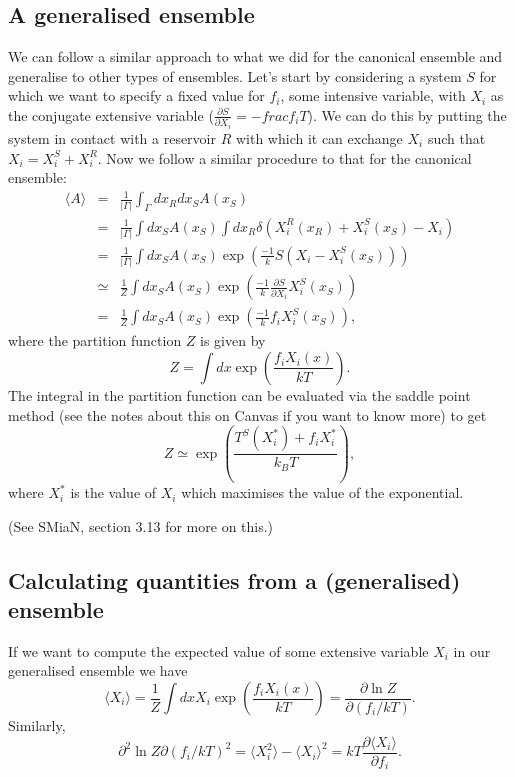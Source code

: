 \subsection{A generalised ensemble}
We can follow a similar approach to what we did for the canonical ensemble and generalise to other types of ensembles. Let's start by considering a system $S$ for which we want to specify a fixed value for $f_i$, some intensive variable, with $X_i$ as the conjugate extensive variable ($\frac{\partial S}{\partial X_i}=-frac{f_i}{T}$). We can do this by putting the system in contact with a reservoir $R$ with which it can exchange $X_i$ such that $X_i = X_i^S+X_i^R$. Now we follow a similar procedure to that for the canonical ensemble:
\begin{eqnarray*}
	\langle A \rangle &=& \frac{1}{|\Gamma|}\int_{\Gamma}dx_R dx_S A(x_S)\\
	&=& \frac{1}{|\Gamma|}\int dx_S A(x_S)\int dx_R \delta(X_i^R(x_R)+X_i^S(x_S)-X_i)\\
	&=& \frac{1}{|\Gamma|}\int dx_S A(x_S)\exp\left( \frac{-1}{k}S(X_i-X_i^S(x_S))\right)\\
	&\simeq& \frac{1}{Z}\int dx_S A(x_S)\exp\left( \frac{-1}{k}\frac{\partial S}{\partial X_i}X_i^S(x_S)\right)\\
	&=& \frac{1}{Z}\int dx_S A(x_S)\exp\left( \frac{-1}{k} f_i X_i^S(x_S)\right),
\end{eqnarray*}
where the partition function $Z$ is given by
$$
	Z= \int dx \exp\left( \frac{f_iX_i(x)}{kT} \right).
$$
The integral in the partition function can be evaluated via the saddle point method (see the notes about this on Canvas if you want to know more) to get
\begin{equation*}
	Z \simeq \exp\left(\frac{T^S(X_i^*)+f_iX_i^*}{k_BT}\right),
\end{equation*}
where $X_i^*$ is the value of $X_i$ which maximises the value of the exponential.

(See SMiaN, section 3.13 for more on this.)

\subsection{Calculating quantities from a (generalised) ensemble}

If we want to compute the expected value of some extensive variable $X_i$ in our generalised ensemble we have
\[
	\langle X_i\rangle = \frac{1}{Z}\int dx X_i \exp\left(\frac{f_iX_i(x)}{kT}\right) = \frac{\partial \ln Z}{\partial (f_i/kT)}.
\]
Similarly,
\[
	{\partial^2 \ln Z}{\partial (f_i/kT)^2} = \langle X_i^2 \rangle - \langle X_i \rangle^2 = kT\frac{\partial \langle X_i\rangle}{\partial f_i}.
\]

